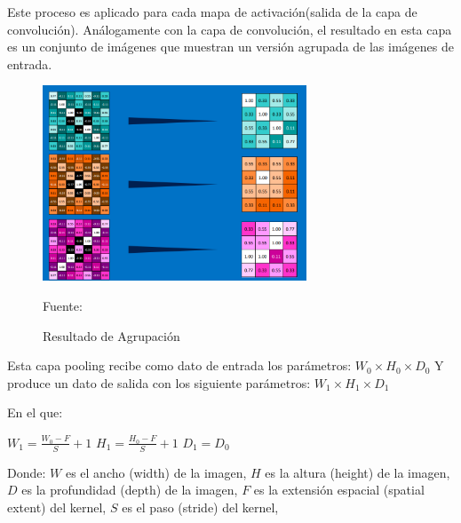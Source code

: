 		Este proceso es aplicado para cada mapa de activación(salida de la capa de convolución). Análogamente con la capa de convolución, el resultado en esta capa es un conjunto de imágenes que muestran un versión agrupada de las imágenes de entrada.

		\begin{figure}[H]
		\begin{center}
		\includegraphics[width=0.7\textwidth]{images/marcoteorico/pool2}
		\end{center}
		\begin{center}
		\caption{\small{Resultado de Agrupación}}
		\vskip -0.2cm  
		{\small{Fuente: \citep{Rohrer}}}
		\end{center}
		\vspace{-1.5em}
		\end{figure}


		\noindent Esta capa pooling recibe como dato de entrada los parámetros:
		${W_{0}}\times{H_{0}}\times{D_{0}}$ \newline
		Y produce un dato de salida con los siguiente parámetros: ${W_{1}}\times{H_{1}}\times{D_{1}}$\newline
		
		\begin{minipage}[t]{0.5\textwidth}
		En el que:
		\begin{center}
		 ${W_{1}} = \frac{{W_{0}} - F }{S} +1$ 
		\vskip 0.4cm 
		 ${H_{1}} = \frac{{H_{0}} - F }{S} +1$ 
		\vskip 0.4cm 
		 ${D_{1}} = {D_{0}}$ 
		 \end{center}
		\vskip 0.6cm 
		\end{minipage}
		\begin{minipage}[t]{0.55\textwidth}
		Donde:
		\vskip 0.1cm 
		$W$ es el ancho (width) de la imagen, \vskip 0.4cm  
		$H$ es la altura (height) de la imagen,\vskip 0.4cm 
		$D$ es la profundidad (depth) de la imagen,\vskip 0.4cm 
		$F$ es la extensión espacial (spatial extent) del kernel,\vskip 0.4cm 
		$S$ es el paso (stride) del kernel,\vskip 0.4cm 
		\end{minipage}

